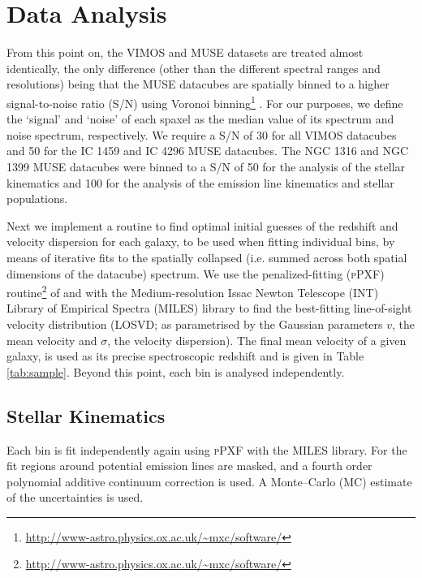 \documentclass[fleqn,usenatbib,useAMS]{mnras}
\begin{document}
\section{Data Analysis}
	\label{sec:analysis}
	From this point on, the VIMOS and MUSE datasets are treated almost identically, the only difference (other than the different spectral ranges and resolutions) being that the MUSE datacubes are spatially binned to a higher signal-to-noise ratio (S/N) using Voronoi binning\footnote{\url{http://www-astro.physics.ox.ac.uk/~mxc/software/}} \citep{Cappellari2003}. For our purposes, we define the `signal' and `noise' of each spaxel as the median value of its spectrum and noise spectrum, respectively. We require a S/N of 30 for all VIMOS datacubes and 50 for the IC 1459 and IC 4296 MUSE datacubes. The NGC 1316 and NGC 1399 MUSE datacubes were binned to a S/N of 50 for the analysis of the stellar kinematics and 100 for the analysis of the emission line kinematics and stellar populations.

	Next we implement a routine to find optimal initial guesses of the redshift and velocity dispersion for each galaxy, to be used when fitting individual bins, by means of iterative fits to the spatially collapsed (i.e. summed across both spatial dimensions of the datacube) spectrum. We use the penalized-fitting (\textsc{pPXF}) routine\footnote{\url{http://www-astro.physics.ox.ac.uk/~mxc/software/}} of \citet{Cappellari2004} and \citet{Cappellari2016a} with the Medium-resolution Issac Newton Telescope (INT) Library of Empirical Spectra (MILES) library \citep{Sanchez-Blazquez2006, Falcon-Barroso2011a} to find the best-fitting line-of-sight velocity distribution (LOSVD; as parametrised by the Gaussian parameters $v$, the mean velocity and $\sigma$, the velocity dispersion). The final mean velocity of a given galaxy, is used as its precise spectroscopic redshift and is given in Table \ref{tab:sample}. Beyond this point, each bin is analysed independently.

	\subsection{Stellar Kinematics}
		\label{subsec:starKin}
		Each bin is fit independently again using \textsc{pPXF} with the MILES library. For the fit regions around potential emission lines are masked, and a fourth order polynomial additive continuum correction is used. A Monte--Carlo (MC) estimate of the uncertainties is used. 
\end{document}
